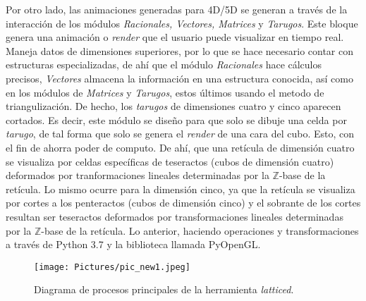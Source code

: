\documentclass{llncs}
\begin{document}
Por otro lado, las animaciones generadas para 4D/5D se generan a través de la interacción de los módulos \textit{Racionales, Vectores, Matrices} y \textit{Tarugos}. Este bloque genera una animación o \textit{render} que el usuario puede visualizar en tiempo real. Maneja datos de dimensiones superiores, por lo que se hace necesario contar con estructuras especializadas, de ahí que el módulo \textit{Racionales} hace cálculos precisos, \textit{Vectores} almacena la información en una estructura conocida, así como en los módulos de \textit{Matrices} y \textit{Tarugos}, estos últimos usando el metodo de triangulizaci\'on. De hecho, los \textit{tarugos} de dimensiones cuatro y cinco aparecen cortados. Es decir, este módulo se diseño para que solo se dibuje una celda por \textit{tarugo}, de tal forma que solo se genera el \textit{render} de una cara del cubo. Esto, con el fin de ahorra poder de computo. De ahí, que una ret\'icula de dimensi\'on cuatro se visualiza por celdas espec\'ificas de teseractos (cubos de dimensi\'on cuatro) deformados por tranformaciones lineales determinadas por la $\mathbb{Z}$-base de la ret\'icula. Lo mismo ocurre para la dimensi\'on cinco, ya que la ret\'icula se visualiza por cortes a los penteractos (cubos de dimensi\'on cinco) y el sobrante de los cortes resultan ser teseractos deformados por transformaciones lineales determinadas por la $\mathbb{Z}$-base de la retícula. Lo anterior, haciendo operaciones y transformaciones a través de Python 3.7 y la biblioteca llamada PyOpenGL. 

\begin{figure}
	\centering
	\texttt{[image: Pictures/pic\_new1.jpeg]}
	\caption{Diagrama de procesos principales de la herramienta \textit{latticed}.}
	\label{Actividades}
\end{figure}
\newpage
\end{document}
